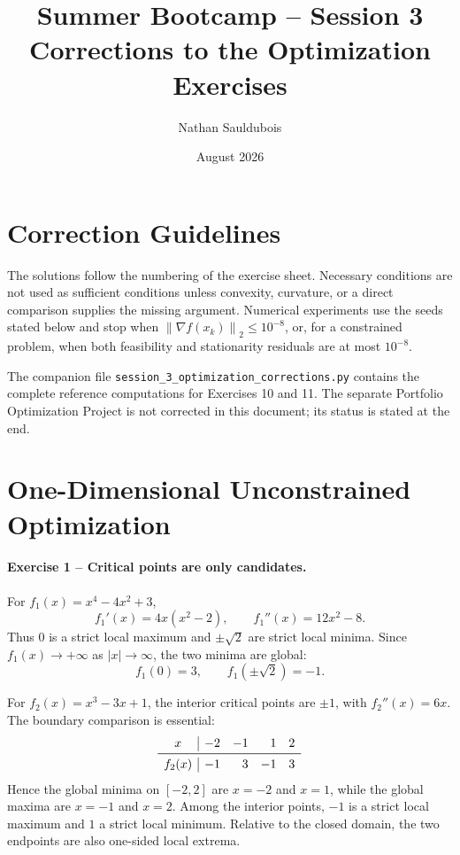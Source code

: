 \documentclass[10pt]{article}
\title{Summer Bootcamp -- Session 3\\Corrections to the Optimization Exercises}
\author{Nathan Sauldubois}
\date{August 2026}
\newcommand{\norm}[1]{\left\lVert#1\right\rVert}
\begin{document}
\maketitle

\section*{Correction Guidelines}

The solutions follow the numbering of the exercise sheet. Necessary conditions
are not used as sufficient conditions unless convexity, curvature, or a direct
comparison supplies the missing argument. Numerical experiments use the seeds
stated below and stop when
\(\norm{\nabla f(x_k)}_2\leq10^{-8}\), or, for a constrained problem, when
both feasibility and stationarity residuals are at most \(10^{-8}\).

The companion file
\texttt{session\_3\_optimization\_corrections.py} contains the complete
reference computations for Exercises 10 and 11. The separate Portfolio
Optimization Project is not corrected in this document; its status is stated
at the end.

\section{One-Dimensional Unconstrained Optimization}

\paragraph{Exercise 1 -- Critical points are only candidates.}

For \(f_1(x)=x^4-4x^2+3\),
\[
f_1'(x)=4x(x^2-2),\qquad f_1''(x)=12x^2-8.
\]
Thus \(0\) is a strict local maximum and \(\pm\sqrt2\) are strict local
minima. Since \(f_1(x)\to+\infty\) as \(|x|\to\infty\), the two minima are
global:
\[
f_1(0)=3,\qquad f_1(\pm\sqrt2)=-1.
\]

For \(f_2(x)=x^3-3x+1\), the interior critical points are \(\pm1\), with
\(f_2''(x)=6x\). The boundary comparison is essential:
\[
\begin{array}{c|rrrr}
x&-2&-1&1&2\\ \midrule
f_2(x)&-1&3&-1&3
\end{array}
\]
Hence the global minima on \([-2,2]\) are \(x=-2\) and \(x=1\), while the
global maxima are \(x=-1\) and \(x=2\). Among the interior points, \(-1\) is a
strict local maximum and \(1\) a strict local minimum. Relative to the closed
domain, the two endpoints are also one-sided local extrema.
\end{document}
